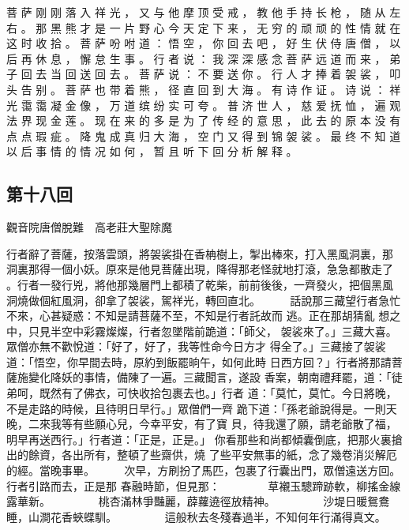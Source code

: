 {菩 萨 刚 刚 落 入 祥 光 ， 又 与 他 摩 顶 受 戒 ， 教 他 手 持 长 枪 ， 随 从 左 右 。
那 黑 熊 才 是 一 片 野 心 今 天 定 下 来 ， 无 穷 的 顽 顽 的 性 情 就 在 这 时 收 拾 。
菩 萨 吩 咐 道 ： 悟 空 ， 你 回 去 吧 ， 好 生 伏 侍 唐 僧 ， 以 后 再 休 息 ， 懈 怠 生 事 。
行 者 说 ： 我 深 深 感 念 菩 萨 远 道 而 来 ， 弟 子 回 去 当 回 送 回 去 。
菩 萨 说 ： 不 要 送 你 。
行 人 才 捧 着 袈 裟 ， 叩 头 告 别 。
菩 萨 也 带 着 熊 ， 径 直 回 到 大 海 。
有 诗 作 证 。
诗 说 ： 祥 光 霭 霭 凝 金 像 ， 万 道 缤 纷 实 可 夸 。
普 济 世 人 ， 慈 爱 抚 恤 ， 遍 观 法 界 现 金 莲 。
现 在 来 的 多 是 为 了 传 经 的 意 思 ， 此 去 的 原 本 没 有 点 点 瑕 疵 。
降 鬼 成 真 归 大 海 ， 空 门 又 得 到 锦 袈 裟 。
最 终 不 知 道 以 后 事 情 的 情 况 如 何 ， 暂 且 听 下 回 分 析 解 释 。
}\switchcolumn\flushpage  \begin{pinyinscope}{\myfontt \section{第十八回}     觀音院唐僧脫難　高老莊大聖除魔

行者辭了菩薩，按落雲頭，將袈裟掛在香柟樹上，掣出棒來，打入黑風洞裏，那
洞裏那得一個小妖。原來是他見菩薩出現，降得那老怪就地打滾，急急都散走了
。行者一發行兇，將他那幾層門上都積了乾柴，前前後後，一齊發火，把個黑風
洞燒做個紅風洞，卻拿了袈裟，駕祥光，轉回直北。
　　
話說那三藏望行者急忙不來，心甚疑惑：不知是請菩薩不至，不知是行者託故而
逃。正在那胡猜亂 想之中，只見半空中彩霧燦燦，行者忽墜階前跪道：「師父，
袈裟來了。」三藏大喜。眾僧亦無不歡悅道：「好了，好了，我等性命今日方才
得全了。」三藏接了袈裟道：「悟空，你早間去時，原約到飯罷晌午，如何此時
日西方回？」行者將那請菩薩施變化降妖的事情，備陳了一遍。三藏聞言，遂設
香案，朝南禮拜罷，道：「徒弟呵，既然有了佛衣，可快收拾包裹去也。」行者
道：「莫忙，莫忙。今日將晚，不是走路的時候，且待明日早行。」眾僧們一齊
跪下道：「孫老爺說得是。一則天晚，二來我等有些願心兒，今幸平安，有了寶
貝，待我還了願，請老爺散了福，明早再送西行。」行者道：「正是，正是。」
你看那些和尚都傾囊倒底，把那火裏搶出的餘資，各出所有，整頓了些齋供，燒
了些平安無事的紙，念了幾卷消災解厄的經。當晚事畢。
　　
次早，方刷扮了馬匹，包裹了行囊出門，眾僧遠送方回。行者引路而去，正是那
春融時節，但見那：
　　　　草襯玉驄蹄跡軟，柳搖金線露華新。
　　　　桃杏滿林爭豔麗，薜蘿遶徑放精神。
　　　　沙堤日暖鴛鴦睡，山澗花香蛺蝶馴。
　　　　這般秋去冬殘春過半，不知何年行滿得真文。

}
\end{pinyinscope}
